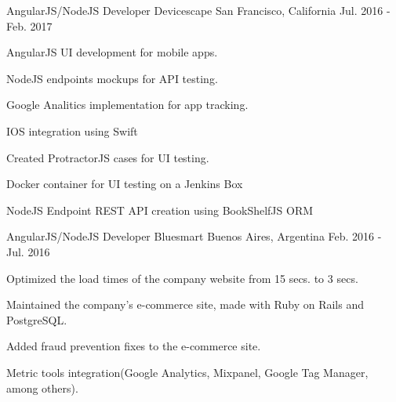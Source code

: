 \begin{cventries}
    \cventry
    {AngularJS/NodeJS Developer} %
    {Devicescape} %
    {San Francisco, California} %
    {Jul. 2016 - Feb. 2017} %
    {
    \begin{cvitems} %
        \item {AngularJS UI development for mobile apps.}
        \item {NodeJS endpoints mockups for API testing.}
        \item {Google Analitics implementation for app tracking.}
        \item {IOS integration using Swift}
        \item {Created ProtractorJS cases for UI testing.}
        \item {Docker container for UI testing on a Jenkins Box}
        \item {NodeJS Endpoint REST API creation using BookShelfJS ORM}
    \end{cvitems}
    }


    \cventry
    {AngularJS/NodeJS Developer} %
    {Bluesmart} %
    {Buenos Aires, Argentina} %
    {Feb. 2016 - Jul. 2016} %
    {
    \begin{cvitems} %
        \item {Optimized the load times of the company website from 15 secs. to 3 secs.}
        \item {Maintained the company's e-commerce site, made with Ruby on Rails and PostgreSQL.}
        \item {Added fraud prevention fixes to the e-commerce site.}
        \item {Metric tools integration(Google Analytics, Mixpanel, Google Tag Manager, among others).}
    \end{cvitems}
    }


\end{cventries}

